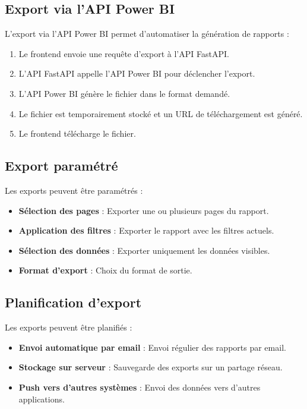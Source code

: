 \subsection{Export via l'API Power BI}

L'export via l'API Power BI permet d'automatiser la génération de rapports :

\begin{enumerate}
    \item Le frontend envoie une requête d'export à l'API FastAPI.
    \item L'API FastAPI appelle l'API Power BI pour déclencher l'export.
    \item L'API Power BI génère le fichier dans le format demandé.
    \item Le fichier est temporairement stocké et un URL de téléchargement est généré.
    \item Le frontend télécharge le fichier.
\end{enumerate}

\subsection{Export paramétré}

Les exports peuvent être paramétrés :

\begin{itemize}
    \item \textbf{Sélection des pages} : Exporter une ou plusieurs pages du rapport.
    \item \textbf{Application des filtres} : Exporter le rapport avec les filtres actuels.
    \item \textbf{Sélection des données} : Exporter uniquement les données visibles.
    \item \textbf{Format d'export} : Choix du format de sortie.
\end{itemize}

\subsection{Planification d'export}

Les exports peuvent être planifiés :

\begin{itemize}
    \item \textbf{Envoi automatique par email} : Envoi régulier des rapports par email.
    \item \textbf{Stockage sur serveur} : Sauvegarde des exports sur un partage réseau.
    \item \textbf{Push vers d'autres systèmes} : Envoi des données vers d'autres applications.
\end{itemize}

